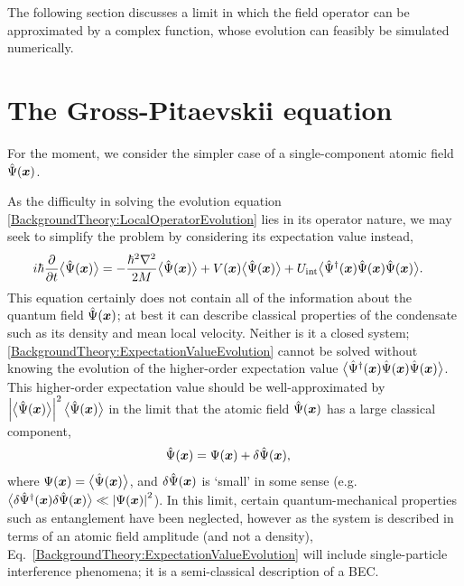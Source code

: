 The following section discusses a limit in which the field operator can be approximated by a complex function, whose evolution can feasibly be simulated numerically.

\section{The Gross-Pitaevskii equation}
\label{BackgroundTheory:GrossPitaevskiiEquation}

For the moment, we consider the simpler case of a single-component atomic field $\hat{\Psi}(\bm{x})$.

As the difficulty in solving the evolution equation \eqref{BackgroundTheory:LocalOperatorEvolution} lies in its operator nature, we may seek to simplify the problem by considering its expectation value instead,
\begin{align}
    i \hbar \frac{\partial}{\partial t} \mean{\hat{\Psi}(\vect{x})} &= - \frac{\hbar^2 \nabla^2}{2 M} \mean{\hat{\Psi}(\vect{x})} + V(\vect{x})\mean{\hat{\Psi}(\vect{x})} + U_\text{int} \mean{\hat{\Psi}^\dagger (\vect{x}) \hat{\Psi}(\vect{x}) \hat{\Psi}(\vect{x})}. \label{BackgroundTheory:ExpectationValueEvolution}
\end{align}
This equation certainly does not contain all of the information about the quantum field $\hat{\Psi}(\bm{x})$; at best it can describe classical properties of the condensate such as its density and mean local velocity.  Neither is it a closed system; \eqref{BackgroundTheory:ExpectationValueEvolution} cannot be solved without knowing the evolution of the higher-order expectation value ${\big<\hat{\Psi}^\dagger(\bm{x}) \hat{\Psi}(\bm{x}) \hat{\Psi}(\bm{x})\big>}$.  This higher-order expectation value should be well-approximated by $\left|{\big<\hat{\Psi}(\bm{x})\big>}\right|^2{\big<\hat{\Psi}(\bm{x})\big>}$ in the limit that the atomic field $\hat{\Psi}(\bm{x})$ has a large classical component,
\begin{align}
    \hat{\Psi}(\vect{x}) &= \Psi(\vect{x}) + \delta\hat{\Psi}(\vect{x}), \label{BackgroundTheory:FieldOperatorDecomposition}
\end{align}
where $\Psi(\bm{x}) = {\big<\hat{\Psi}(\bm{x})\big>}$, and $\delta\hat{\Psi}(\bm{x})$ is `small' in some sense (e.g. ${\big<\delta\hat{\Psi}^\dagger(\bm{x}) \delta\hat{\Psi}(\bm{x})\big>} \ll \left|\Psi(\bm{x})\right|^2$).  In this limit, certain quantum-mechanical properties such as entanglement have been neglected, however as the system is described in terms of an atomic field amplitude (and not a density), Eq.~\eqref{BackgroundTheory:ExpectationValueEvolution} will include single-particle interference phenomena; it is a semi-classical description of a BEC.

